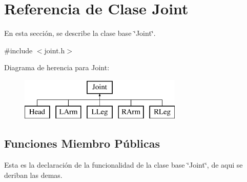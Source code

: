 \hypertarget{class_joint}{\section{\-Referencia de \-Clase \-Joint}
\label{class_joint}
}


\-En esta sección, se describe la clase base \char`\"{}\-Joint\char`\"{}.  




{\ttfamily \#include $<$joint.\-h$>$}

\-Diagrama de herencia para \-Joint\-:\begin{figure}[H]
\begin{center}
\leavevmode
\includegraphics[height=2.000000cm]{class_joint}
\end{center}
\end{figure}
\subsection*{\-Funciones \-Miembro \-Públicas}

\-Esta es la declaración de la funcionalidad de la clase base \char`\"{}\-Joint\char`\"{}, de aqui se deriban las demas.

